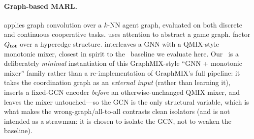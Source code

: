 \paragraph{Graph-based MARL.}  \citep{jiang_2020_dgn} applies
graph convolution over a $k$-NN agent graph, evaluated on both discrete
and continuous cooperative tasks.
 \citep{liu_2020_g2anet} uses attention to abstract a
game graph. 
\citep{boehmer_2020_dcg} factor $Q_{\mathrm{tot}}$ over a hyperedge structure.
 \citep{naderializadeh_2020_graphmix} interleaves a GNN
with a QMIX-style monotonic mixer, closest in spirit to the
\gnnqmix\ baseline we evaluate here. Our \gnnqmix\ is a deliberately
\emph{minimal} instantiation of this GraphMIX-style ``GNN + monotonic mixer''
family rather than a re-implementation of GraphMIX's full pipeline: it
takes the coordination graph as an \emph{external input} (rather than learning
it), inserts a fixed-GCN encoder \emph{before} an otherwise-unchanged QMIX
mixer, and leaves the mixer untouched---so the GCN is the only structural
variable, which is what makes the wrong-graph/all-to-all contrasts clean
isolators (and is not intended as a strawman: it is chosen to isolate the GCN,
not to weaken the baseline).

